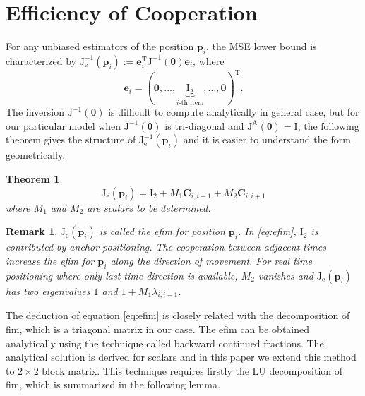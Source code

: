 \documentclass[conference]{IEEEtran}
\newtheorem{theorem}{Theorem}
\newtheorem{remark}{Remark}
\begin{document}
\section{Efficiency of Cooperation}\label{efficiency}
For any unbiased estimators of the position $\bm{p}_i$, the MSE lower bound is characterized by $\bm{\mathrm{J}}^{-1}_{\mathrm{e}}(\bm{p}_i):=\bm{e}_i^{\textrm{T}}\bm{\mathrm{J}}^{-1}(\bm{\theta})\bm{e}_i$, where
\begin{equation}
\bm{e}_i=(\bm{0},\dots,\underbrace{\bm{\mathrm{I}}_2}_{\text{$i$-th item}},\dots,\bm{0})^{\textrm{T}}.
\end{equation}
The inversion $\bm{\mathrm{J}}^{-1}(\bm{\theta})$ is difficult to compute analytically in general case, but for our particular model when $\bm{\mathrm{J}}^{-1}(\bm{\theta})$ is tri-diagonal and $\bm{\mathrm{J}}^\mathrm{A}(\bm{\theta})= \bm{\mathrm{I}}$, the following theorem gives the structure of $\bm{\mathrm{J}}^{-1}_{\mathrm{e}}(\bm{p}_i)$ and it is easier to understand the form geometrically.
\begin{theorem}
\begin{equation}\label{eq:efim}
\bm{\mathrm{J}}_{\mathrm{e}}(\bm{p}_i)=\bm{\mathrm{I}}_2+M_1 \bm{C}_{i,i-1} +M_2 \bm{C}_{i,i+1}
\end{equation}
where $M_1$ and $M_2$ are scalars to be determined.
\end{theorem}
\begin{remark}
$\bm{\mathrm{J}}_{\mathrm{e}}(\bm{p}_i)$ is called the \ac{efim} for position $\bm{p}_i$\cite{LimitBound2}.
In \eqref{eq:efim}, $\bm{\mathrm{I}}_2$ is contributed by anchor positioning. 
The cooperation between adjacent times increase the \ac{efim} for $\bm{p}_i$ along the direction of movement. For real time positioning where only last time direction is available, $M_2$ vanishes and $\bm{\mathrm{J}}_{\mathrm{e}}(\bm{p}_i)$ 
has two eigenvalues $1$ and $1+M_1\lambda_{i,i-1}$.
\end{remark}
The deduction of equation \eqref{eq:efim} is closely related with the decomposition of \ac{fim}, which is a triagonal matrix in our case. 
The \ac{efim} can be obtained analytically using the technique called backward continued fractions\cite{K2008Explicit}. 
The analytical solution is derived for scalars and in this paper we extend this method to $2\times 2$ block matrix. 
This technique requires firstly the LU decomposition of \ac{fim}, which is summarized in the following lemma.
\end{document}
